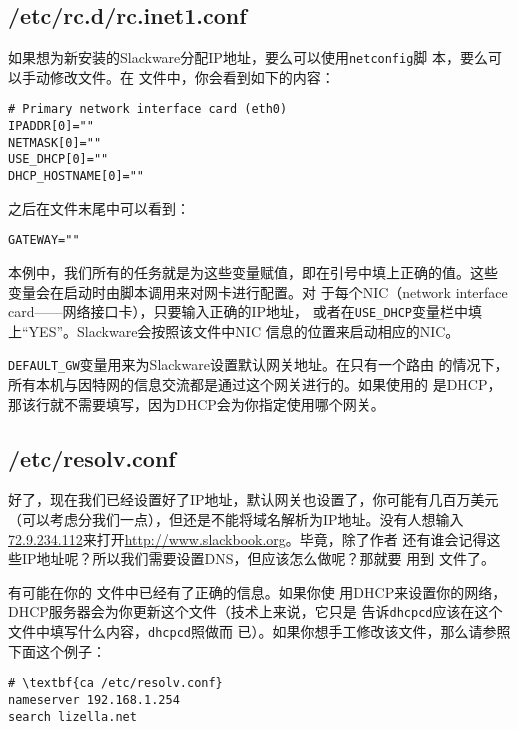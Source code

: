 \subsection{/etc/rc.d/rc.inet1.conf}
\label{sec:networkConfiguration:tcpIP:inet1.conf}
如果想为新安装的Slackware分配IP地址，要么可以使用\texttt{netconfig}脚
本，要么可以手动修改文件。在
文件中，你会看到如下的内容：
\begin{Verbatim}[frame=single,commandchars=\\\{\}]
# Primary network interface card (eth0)
IPADDR[0]=""
NETMASK[0]=""
USE_DHCP[0]=""
DHCP_HOSTNAME[0]=""
\end{Verbatim}
之后在文件末尾中可以看到：
\begin{Verbatim}[frame=single,commandchars=\\\{\}]
GATEWAY=""
\end{Verbatim}
本例中，我们所有的任务就是为这些变量赋值，即在引号中填上正确的值。这些
变量会在启动时由脚本调用来对网卡进行配置。对
于每个NIC（network interface card——网络接口卡），只要输入正确的IP地址，
或者在\texttt{USE\_DHCP}变量栏中填上``YES''。Slackware会按照该文件中NIC
信息的位置来启动相应的NIC。

\texttt{DEFAULT\_GW}变量用来为Slackware设置默认网关地址。在只有一个路由
的情况下，所有本机与因特网的信息交流都是通过这个网关进行的。如果使用的
是DHCP，那该行就不需要填写，因为DHCP会为你指定使用哪个网关。

\subsection{/etc/resolv.conf}
\label{sec:networkConfiguration:tcpIP:resolv.conf}
好了，现在我们已经设置好了IP地址，默认网关也设置了，你可能有几百万美元
（可以考虑分我们一点），但还是不能将域名解析为IP地址。没有人想输入
\url{72.9.234.112}来打开\url{http://www.slackbook.org}。毕竟，除了作者
还有谁会记得这些IP地址呢？所以我们需要设置DNS，但应该怎么做呢？那就要
用到 文件了。

有可能在你的 文件中已经有了正确的信息。如果你使
用DHCP来设置你的网络，DHCP服务器会为你更新这个文件（技术上来说，它只是
告诉\texttt{dhcpcd}应该在这个文件中填写什么内容，\texttt{dhcpcd}照做而
已）。如果你想手工修改该文件，那么请参照下面这个例子：

\begin{Verbatim}[frame=single,commandchars=\\\{\}]
# \textbf{ca /etc/resolv.conf}
nameserver 192.168.1.254
search lizella.net
\end{Verbatim}

